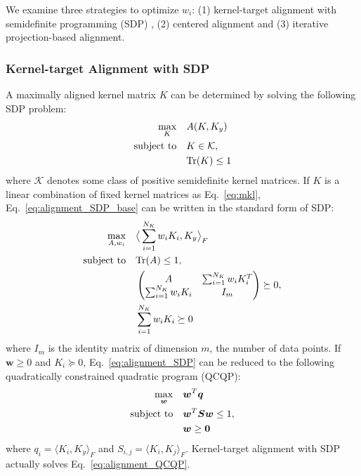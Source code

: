 \documentclass[reprint,amsfonts, amssymb, amsmath,  showkeys, nofootinbib,pra, superscriptaddress, twocolumn,longbibliography]{revtex4-2}
\begin{document}
We examine three strategies to optimize $w_i$: (1) kernel-target alignment with semidefinite programming (SDP) \cite{JMLR:v5:Lanckriet}, (2) centered alignment \cite{JMLR:v13:cortes12a} and (3) iterative projection-based alignment. 

\subsubsection{Kernel-target Alignment with SDP}
A maximally aligned kernel matrix $K$ can be determined by solving the following SDP problem:
\begin{align}
    \max_{K} \quad &\null A(K, K_y) \label{eq:alignment_SDP_base} \\
    \text{subject to} \quad &\null K \in \mathcal{K}, \nonumber \\
    &\null \text{Tr}(K) \le 1 \nonumber
\end{align}
where $\mathcal{K}$ denotes some class of positive semidefinite kernel matrices. If $K$ is a linear combination of fixed kernel matrices as Eq.~\ref{eq:mkl}, Eq.~\ref{eq:alignment_SDP_base} can be written in the standard form of SDP:
\begin{align}
    \max_{A, w_i} \quad &\null \big\langle \sum^{N_K}_{i=1}w_iK_i, K_y \big\rangle_F \label{eq:alignment_SDP}\\
    \text{subject to} \quad &\null \text{Tr}(A) \le 1, \nonumber \\
    &\null \begin{pmatrix}
            A & \sum^{N_K}_{i=1}w_iK^T_i \nonumber \\
            \sum^{N_K}_{i=1}w_iK_i & I_m \nonumber \\
        \end{pmatrix} \succeq 0, \nonumber \\
    &\null \sum^{N_K}_{i=1}w_iK_i \succeq 0 \nonumber
\end{align}
where $I_m$ is the identity matrix of dimension $m$, the number of data points. If $\bm{w} \ge 0$ and $K_i \succeq 0$, Eq.~\ref{eq:alignment_SDP} can be reduced to the following quadratically constrained quadratic program (QCQP):
\begin{align}
    \max_{\bm{w}} \quad &\null \bm{w}^T \bm{q} \label{eq:alignment_QCQP} \\
    \text{subject to} \quad &\null \bm{w}^T \bm{S} \bm{w} \le 1, \nonumber \\
    \quad &\null \bm{w} \ge \bm{0} \nonumber
\end{align}
where $q_i = \langle K_i, K_y \rangle_F$ and $S_{i, j} = \langle K_i, K_j \rangle_F$. Kernel-target alignment with SDP actually solves Eq.~\ref{eq:alignment_QCQP}.
\end{document}
